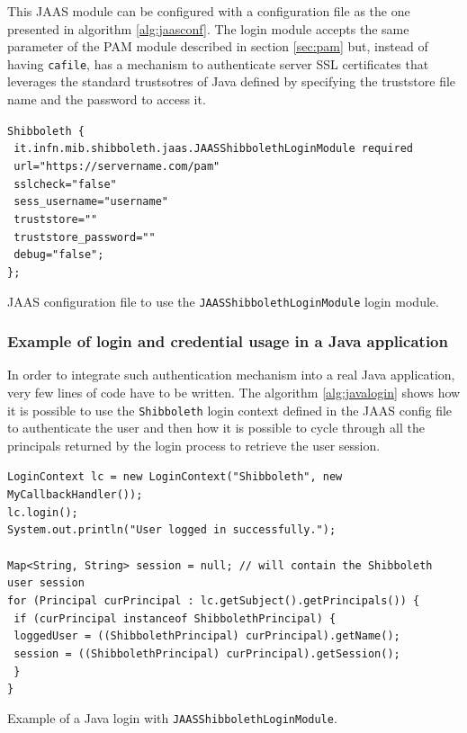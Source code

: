 This JAAS module can be configured with a configuration file as the one presented in algorithm \ref{alg:jaasconf}.
The login module accepts the same parameter of the PAM module described in section \ref{sec:pam} but,
instead of having \texttt{cafile}, has a mechanism to authenticate server SSL certificates that leverages the standard
trustsotres of Java defined by specifying the truststore file name and the password to access it.

\begin{algorithm}[t]
\SetAlgoNoLine
\texttt{Shibboleth \{}\\
\texttt{  it.infn.mib.shibboleth.jaas.JAASShibbolethLoginModule required}\\
\texttt{  		url="https://servername.com/pam"}\\
\texttt{  		sslcheck="false"}\\
\texttt{  		sess\_username="username"}\\
\texttt{  		truststore=""}\\
\texttt{  		truststore\_password=""}\\
\texttt{  		debug="false";}\\
\texttt{\};}
\caption{JAAS configuration file to use the \texttt{JAASShibbolethLoginModule} login module.}
\label{alg:jaasconf}
\end{algorithm}

\label{sec:javaws}
\subsubsection{Example of login and credential usage in a Java application}
In order to integrate such authentication mechanism into a real Java application, very few lines of code have to be
written.
The algorithm \ref{alg:javalogin} shows how it is possible to use the \texttt{Shibboleth} login context defined in the
JAAS config file to authenticate the user and then how it is possible to cycle through all the principals returned
by the login process to retrieve the user session.

\begin{algorithm}[t]
\SetAlgoNoLine
\texttt{LoginContext lc =  new LoginContext("Shibboleth", new MyCallbackHandler());}\\
\texttt{lc.login();}\\
\texttt{System.out.println("User logged in successfully.");}\\
\texttt{}\\
\texttt{Map<String, String> session = null; // will contain the Shibboleth user session}\\
\texttt{for (Principal curPrincipal : lc.getSubject().getPrincipals()) \{}\\
\texttt{	if (curPrincipal instanceof ShibbolethPrincipal) \{}\\
\texttt{		loggedUser = ((ShibbolethPrincipal) curPrincipal).getName();}\\
\texttt{		session = ((ShibbolethPrincipal) curPrincipal).getSession();}\\
\texttt{	\}}\\
\texttt{\}}
\caption{Example of a Java login with \texttt{JAASShibbolethLoginModule}.}
\label{alg:javalogin}
\end{algorithm}

